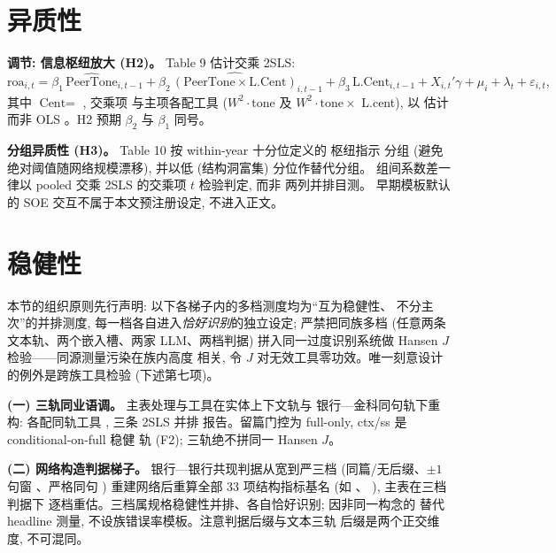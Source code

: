 \section{异质性}\label{sec:het}

\textbf{调节: 信息枢纽放大 (H2)。} Table 9 估计交乘 2SLS:
\begin{equation}
\text{roa}_{i,t} = \beta_{1}\,\widehat{\text{PeerTone}}_{i,t-1}
 + \beta_{2}\,\widehat{(\text{PeerTone} \times
 \text{L.Cent})}_{i,t-1}
 + \beta_{3}\,\text{L.Cent}_{i,t-1}
 + X_{i,t}'\gamma + \mu_{i} + \lambda_{t} + \varepsilon_{i,t},
\label{eq:moderation}
\end{equation}
其中 $\text{Cent} = $ , 交乘项
 与主项各配工具
($W^{2}\cdot\text{tone}$ 及 $W^{2}\cdot\text{tone} \times$
L.cent), 以  估计而非 OLS
\parencite{brambor2006understanding}。H2 预期
$\beta_{2}$ 与 $\beta_{1}$ 同号。

\textbf{分组异质性 (H3)。} Table 10 按 within-year 十分位定义的
枢纽指示  分组 (避免绝对阈值随网络规模漂移),
并以低  (结构洞富集) 分位作替代分组。
组间系数差一律以 pooled 交乘 2SLS 的交乘项 $t$ 检验判定, 而非
两列并排目测。 早期模板默认的
SOE 交互不属于本文预注册设定, 不进入正文。

\section{稳健性}\label{sec:robust}

本节的组织原则先行声明: 以下各梯子内的多档测度均为``互为稳健性、
不分主次''的并排测度, 每一档各自进入\emph{恰好识别}的独立设定;
严禁把同族多档 (任意两条文本轨、两个嵌入槽、两家 LLM、两档判据)
拼入同一过度识别系统做 Hansen $J$ 检验——同源测量污染在族内高度
相关, 令 $J$ 对无效工具零功效。唯一刻意设计的例外是跨族工具检验
(下述第七项)。

\textbf{(一) 三轨同业语调。} 主表处理与工具在实体上下文轨与
银行—金科同句轨下重构:
 各配同轨工具
, 三条 2SLS 并排
报告。留篇门控为 full-only, ctx/ss 是 conditional-on-full 稳健
轨 (F2); 三轨绝不拼同一 Hansen $J$。

\textbf{(二) 网络构造判据梯子。} 银行—银行共现判据从宽到严三档
(同篇/无后缀、$\pm 1$ 句窗 、严格同句 )
重建网络后重算全部 33 项结构指标基名 (如
、
), 主表在三档判据下
逐档重估。三档属规格稳健性并排、各自恰好识别; 因非同一构念的
替代 headline 测量, 不设族错误率模板。注意判据后缀与文本三轨
后缀是两个正交维度, 不可混同。

